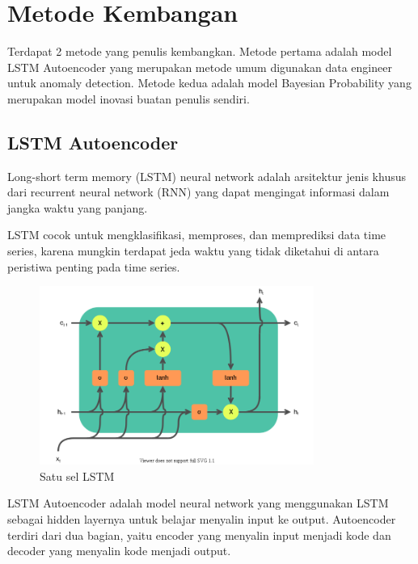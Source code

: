 \chapter{Metode Kembangan}

Terdapat 2 metode yang penulis kembangkan. Metode pertama adalah model LSTM Autoencoder yang merupakan metode umum digunakan data engineer untuk anomaly detection. Metode kedua adalah model Bayesian Probability yang merupakan model inovasi buatan penulis sendiri.

\section{LSTM Autoencoder}

Long-short term memory (LSTM) neural network adalah arsitektur jenis khusus dari recurrent neural network (RNN) yang dapat mengingat informasi dalam jangka waktu yang panjang.

LSTM cocok untuk mengklasifikasi, memproses, dan memprediksi data time series, karena mungkin terdapat jeda waktu yang tidak diketahui di antara peristiwa penting pada time series.

\begin{figure}[h]
    \centering
    \includegraphics[width=0.8\textwidth]{resources/LSTM_cell.png}
    \caption{Satu sel LSTM}
\end{figure}

LSTM Autoencoder adalah model neural network yang menggunakan LSTM sebagai hidden layernya untuk belajar menyalin input ke output. Autoencoder terdiri dari dua bagian, yaitu encoder yang menyalin input menjadi kode dan decoder yang menyalin kode menjadi output.

